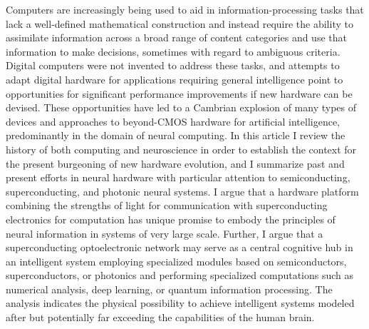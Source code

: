 Computers are increasingly being used to aid in information-processing tasks that lack a well-defined mathematical construction and instead require the ability to assimilate information across a broad range of content categories and use that information to make decisions, sometimes with regard to ambiguous criteria. Digital computers were not invented to address these tasks, and attempts to adapt digital hardware for applications requiring general intelligence point to opportunities for significant performance improvements if new hardware can be devised. These opportunities have led to a Cambrian explosion of many types of devices and approaches to beyond-CMOS hardware for artificial intelligence, predominantly in the domain of neural computing. In this article I review the history of both computing and neuroscience in order to establish the context for the present burgeoning of new hardware evolution, and I summarize past and present efforts in neural hardware with particular attention to semiconducting, superconducting, and photonic neural systems. I argue that a hardware platform combining the strengths of light for communication with superconducting electronics for computation has unique promise to embody the principles of neural information in systems of very large scale. Further, I argue that a superconducting optoelectronic network may serve as a central cognitive hub in an intelligent system employing specialized modules based on semiconductors, superconductors, or photonics and performing specialized computations such as numerical analysis, deep learning, or quantum information processing. The analysis indicates the physical possibility to achieve intelligent systems modeled after but potentially far exceeding the capabilities of the human brain.